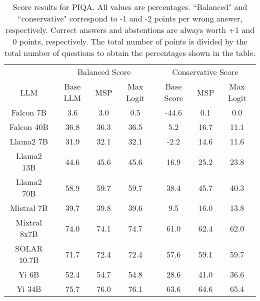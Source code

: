 \renewcommand\arraystretch{1.2}
\begin{table*}
\centering
\begin{tabular}{c|c|c|c|c|c|c}
& \multicolumn{3}{c|}{Balanced Score} & \multicolumn{3}{c}{Conservative Score} \\ 
LLM & Base LLM & MSP & Max Logit & Base Score & MSP & Max Logit\\ \hline
Falcon 7B & 3.6 & 3.0 & 0.5 & -44.6 & 0.1 & 0.0\\
Falcon 40B & 36.8 & 36.3 & 36.5 & 5.2 & 16.7 & 11.1\\
Llama2 7B & 31.9 & 32.1 & 32.1 & -2.2 & 14.6 & 11.6\\
Llama2 13B & 44.6 & 45.6 & 45.6 & 16.9 & 25.2 & 23.8\\
Llama2 70B & 58.9 & 59.7 & 59.7 & 38.4 & 45.7 & 40.3\\
Mistral 7B & 39.7 & 39.8 & 39.6 & 9.5 & 16.0 & 13.8\\
Mixtral 8x7B & 74.0 & 74.1 & 74.7 & 61.0 & 62.4 & 62.0\\
SOLAR 10.7B & 71.7 & 72.4 & 72.4 & 57.6 & 59.1 & 59.7\\
Yi 6B & 52.4 & 54.7 & 54.8 & 28.6 & 41.0 & 36.6\\
Yi 34B & 75.7 & 76.0 & 76.1 & 63.6 & 64.6 & 65.4\\
\hline
\end{tabular}
\caption{Score results for PIQA. All values are percentages. ``Balanced" and ``conservative" correspond to -1 and -2 points per wrong answer, respectively. Correct answers and abstentions are always worth +1 and 0 points, respectively. The total number of points is divided by the total number of questions to obtain the percentages shown in the table.}
\label{tab:piqa_score}
\end{table*}
